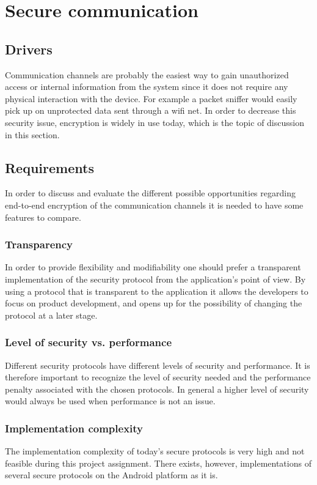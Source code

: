 \section{Secure communication}

\subsection{Drivers}
Communication channels are probably the easiest way to gain unauthorized access or internal information from the system since it does not require any physical interaction with the device.  For example a packet sniffer would easily pick up on unprotected data sent through a wifi net. In order to decrease this security issue, encryption is widely in use today, which is the topic of discussion in this section.

\subsection{Requirements}
In order to discuss and evaluate the different possible opportunities regarding end-to-end encryption of the communication channels it is needed to have some features to compare.

\subsubsection{Transparency}
In order to provide flexibility and modifiability one should prefer a transparent implementation of the security protocol from the application’s point of view. By using a protocol that is transparent to the application it allows the developers to focus on product development, and opens up for the possibility of changing the protocol at a later stage.

\subsubsection{Level of security vs. performance}
Different security protocols have different levels of security and performance. It is therefore important to recognize the level of security needed and the performance penalty associated with the chosen protocols. In general a higher level of security would always be used when performance is not an issue.

\subsubsection{Implementation complexity}
The implementation complexity of today's secure protocols is very high and not feasible during this project assignment. There exists, however, implementations of several secure protocols on the Android platform as it is. 

